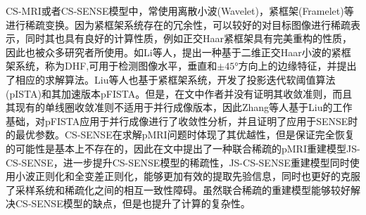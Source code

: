 \documentclass[lang=cn,11pt,a4paper,cite=numbers]{elegantpaper}
\begin{document}
\par CS-MRI或者CS-SENSE模型中，常使用离散小波(Wavelet)，紧框架(Framelet)等进行稀疏变换。因为紧框架系统存在的冗余性，可以较好的对目标图像进行稀疏表示，同时其也具有良好的计算性质，例如正交Haar紧框架具有完美重构的性质，因此也被众多研究者所使用。如Li等人，提出一种基于二维正交Haar小波的紧框架系统，称为DHF\cite{li2016adaptive},可用于检测图像水平，垂直和$±45°$方向上的边缘特征，并提出了相应的求解算法。Liu等人也基于紧框架系统，开发了投影迭代软阈值算法(pISTA)\cite{7448403}和其加速版本pFISTA。但是，在文\cite{7448403}中作者并没有证明其收敛准则，而且其现有的单线圈收敛准则不适用于并行成像版本，因此Zhang等人\cite{ZHANG2021101987}基于Liu的工作基础，对pFISTA应用于并行成像进行了收敛性分析，并且证明了应用于SENSE时的最优参数。CS-SENSE在求解pMRI问题时体现了其优越性，但是保证完全恢复的可能性是基本上不存在的，因此在文\cite{chun2015efficient}中提出了一种联合稀疏的pMRI重建模型JS-CS-SENSE，进一步提升CS-SENSE模型的稀疏性，JS-CS-SENSE重建模型同时使用小波正则化和全变差正则化，能够更加有效的提取先验信息，同时也更好的克服了采样系统和稀疏化之间的相互一致性障碍。虽然联合稀疏的重建模型能够较好解决CS-SENSE模型的缺点，但是也提升了计算的复杂性。
\end{document}
